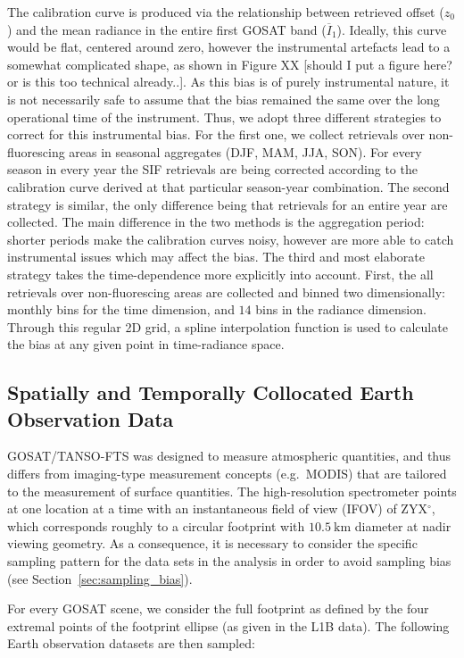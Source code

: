 \documentclass[review, a4paper, 10pt, times]{elsarticle}
\begin{document}
The calibration curve is produced via the relationship between retrieved offset ($z_0$) and the mean radiance in the entire first GOSAT band ($\overline{I}_1$). Ideally, this curve would be flat, centered around zero, however the instrumental artefacts lead to a somewhat complicated shape, as shown in Figure XX [should I put a figure here? or is this too technical already..]. As this bias is of purely instrumental nature, it is not necessarily safe to assume that the bias remained the same over the long operational time of the instrument. Thus, we adopt three different strategies to correct for this instrumental bias. For the first one, we collect retrievals over non-fluorescing areas in seasonal aggregates (DJF, MAM, JJA, SON). For every season in every year the SIF retrievals are being corrected according to the calibration curve derived at that particular season-year combination. The second strategy is similar, the only difference being that retrievals for an entire year are collected. The main difference in the two methods is the aggregation period: shorter periods make the calibration curves noisy, however are more able to catch instrumental issues which may affect the bias. The third and most elaborate strategy takes the time-dependence more explicitly into account. First, the all retrievals over non-fluorescing areas are collected and binned two dimensionally: monthly bins for the time dimension, and $14$ bins in the radiance dimension. Through this regular 2D grid, a spline interpolation function is used to calculate the bias at any given point in time-radiance space.  


\subsection{Spatially and Temporally Collocated Earth Observation Data}
\label{sec:collocation}

GOSAT/TANSO-FTS was designed to measure atmospheric quantities, and thus differs from imaging-type measurement concepts (e.g.~MODIS) that are tailored to the measurement of surface quantities. The high-resolution spectrometer points at one location at a time with an instantaneous field of view (IFOV) of ZYX$^\circ$, which corresponds roughly to a circular footprint with $10.5\:\mathrm{km}$ diameter at nadir viewing geometry. As a consequence, it is necessary to consider the specific sampling pattern for the data sets in the analysis in order to avoid sampling bias (see Section~\ref{sec:sampling_bias}).

For every GOSAT scene, we consider the full footprint as defined by the four extremal points of the footprint ellipse (as given in the L1B data). The following Earth observation datasets are then sampled:
\end{document}
